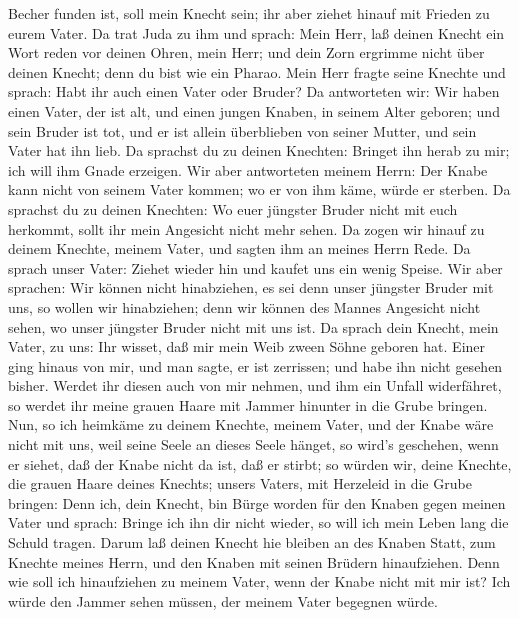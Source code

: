 Becher funden ist, soll mein Knecht sein; ihr aber ziehet hinauf mit
Frieden zu eurem Vater.  Da trat Juda zu ihm und sprach:
Mein Herr, laß deinen Knecht ein Wort reden vor deinen Ohren, mein Herr;
und dein Zorn ergrimme nicht über deinen Knecht; denn du bist wie ein
Pharao.  Mein Herr fragte seine Knechte und sprach: Habt
ihr auch einen Vater oder Bruder?  Da antworteten wir: Wir
haben einen Vater, der ist alt, und einen jungen Knaben, in seinem Alter
geboren; und sein Bruder ist tot, und er ist allein überblieben von
seiner Mutter, und sein Vater hat ihn lieb.  Da sprachst du
zu deinen Knechten: Bringet ihn herab zu mir; ich will ihm Gnade
erzeigen.  Wir aber antworteten meinem Herrn: Der Knabe
kann nicht von seinem Vater kommen; wo er von ihm käme, würde er
sterben.  Da sprachst du zu deinen Knechten: Wo euer
jüngster Bruder nicht mit euch herkommt, sollt ihr mein Angesicht nicht
mehr sehen.  Da zogen wir hinauf zu deinem Knechte, meinem
Vater, und sagten ihm an meines Herrn Rede.  Da sprach
unser Vater: Ziehet wieder hin und kaufet uns ein wenig Speise.
 Wir aber sprachen: Wir können nicht hinabziehen, es sei
denn unser jüngster Bruder mit uns, so wollen wir hinabziehen; denn wir
können des Mannes Angesicht nicht sehen, wo unser jüngster Bruder nicht
mit uns ist.  Da sprach dein Knecht, mein Vater, zu uns:
Ihr wisset, daß mir mein Weib zween Söhne geboren hat. 
Einer ging hinaus von mir, und man sagte, er ist zerrissen; und habe ihn
nicht gesehen bisher.  Werdet ihr diesen auch von mir
nehmen, und ihm ein Unfall widerfähret, so werdet ihr meine grauen Haare
mit Jammer hinunter in die Grube bringen.  Nun, so ich
heimkäme zu deinem Knechte, meinem Vater, und der Knabe wäre nicht mit
uns, weil seine Seele an dieses Seele hänget,  so wird's
geschehen, wenn er siehet, daß der Knabe nicht da ist, daß er stirbt; so
würden wir, deine Knechte, die grauen Haare deines Knechts; unsers
Vaters, mit Herzeleid in die Grube bringen:  Denn ich, dein
Knecht, bin Bürge worden für den Knaben gegen meinen Vater und sprach:
Bringe ich ihn dir nicht wieder, so will ich mein Leben lang die Schuld
tragen.  Darum laß deinen Knecht hie bleiben an des Knaben
Statt, zum Knechte meines Herrn, und den Knaben mit seinen Brüdern
hinaufziehen.  Denn wie soll ich hinaufziehen zu meinem
Vater, wenn der Knabe nicht mit mir ist? Ich würde den Jammer sehen
müssen, der meinem Vater begegnen würde.

